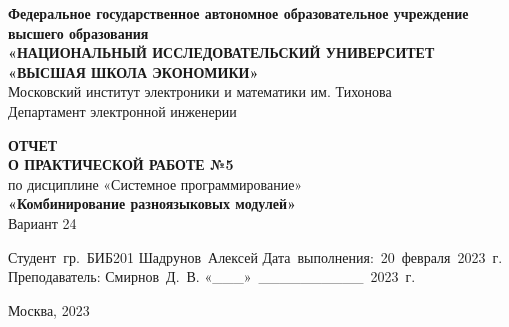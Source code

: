 \begin{titlepage}
        \begin{center}

            \timesfont
            {\large\bf\timesfont Федеральное‌ ‌государственное‌ ‌автономное‌ ‌образовательное‌ ‌учреждение‌ ‌высшего‌ образования\\}
            {\large\bf\timesfont «НАЦИОНАЛЬНЫЙ‌ ‌ИССЛЕДОВАТЕЛЬСКИЙ‌ ‌УНИВЕРСИТЕТ‌ «ВЫСШАЯ‌ ‌ШКОЛА‌ ‌ЭКОНОМИКИ»‌\\}
            Московский‌ ‌институт‌ ‌электроники‌ ‌и‌ ‌математики‌ ‌им. Тихонова‌\\
            Департамент‌ ‌электронной‌ ‌инженерии‌\\

            \vfill
            \vfill

            {\bf\timesfont ОТЧЕТ \\
                О ПРАКТИЧЕСКОЙ РАБОТЕ №5}\\
            по дисциплине «Системное программирование»\\
            {\bf\timesfont «Комбинирование разноязыковых модулей»}\\
            Вариант 24\\


            \vfill
            \vfill
            \vfill

            \hfill\vbox
            {
                \hbox{Студент гр. БИБ201}
                \hbox{Шадрунов Алексей}
                \hbox{Дата выполнения: 20 февраля 2023 г.}
                \hbox{}
                \hbox{Преподаватель:}
                \hbox{Смирнов Д. В.}
                \hbox{«\_\_\_» \_\_\_\_\_\_\_\_\_\_ 2023 г.}
            }

            \vfill

            Москва, 2023
        \end{center}
\end{titlepage}

